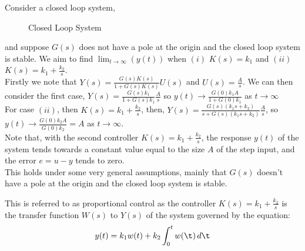 Consider a closed loop system,
\begin{figure}[!ht]
\centering
{}
\caption{Closed Loop System}
\end{figure}
and suppose $G(s)$ does not have a pole at the origin and the closed loop system is stable. We aim to find $\lim_{t\to\infty}(y(t))$ when $(i)$ $K(s) = k_1$ and $(ii)$ $K(s) = k_1 + \frac{k_2}{s}$.\\

Firstly we note that $Y(s) = \frac{G(s)K(s)}{1 + G(s)K(s)}U(s)$ and $U(s) = \frac{A}{s}$. We can then consider the first case, $ Y(s) = \frac{G(s)k_1}{1 + G(s)k_1}\frac{A}{s} $ so $y(t) \to \frac{G(0)k_1A}{1 + G(0)k_1}$ as $t \to\infty$\\
For case $(ii)$, then $K(s) = k_1 + \frac{k_2}{s}$, then, $Y(s) = \frac{G(s)(k_1s + k_2)}{s + G(s)(k_1s+k_2)}\frac{A}{s}$, so $y(t) \to \frac{G(0)k_2 A}{G(0)k_2} = A$ as $t\to \infty$.\\

Note that, with the second controller $K(s) = k_1 + \frac{k_2}{s}$, the response $y(t)$ of the system tends towards a constant value equal to the size $A$ of the step input, and the error $e = u - y$ tends to zero.\\

This holds under some very general assumptions, mainly that $G(s)$ doesn't have a pole at the origin and the closed loop system is stable.

\begin{ndefi}
  This is referred to as proportional control as the controller $K(s) = k_1 + \frac{k_2}{s}$ is the transfer function $W(s)$ to $Y(s)$ of the system governed by the equation:
  $$ y(t) = k_1w(t)+ k_2 \int_0^t w(\t)\,d\t $$
\end{ndefi}
